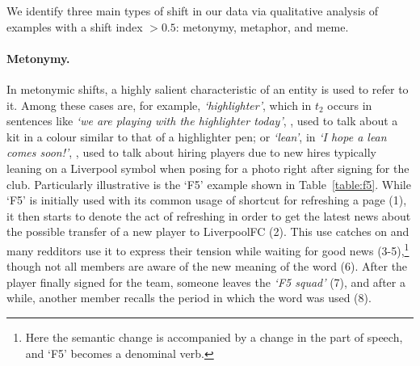 We identify three main types of shift in our data via qualitative analysis of examples with a shift index $> 0.5$: metonymy, metaphor, and meme.  

\paragraph{Metonymy.}
In metonymic shifts, a highly salient characteristic of an entity is used to refer to it. Among these cases are, for example, {\em `highlighter'}, which in $t_2$ occurs in sentences like \textit{`we are playing with the highlighter today'},
, 
used to talk about a kit in a colour similar to that of a highlighter pen; or {\em `lean'}, in \textit{`I hope a lean comes soon!'},
, 
used to talk about hiring players due to new hires typically leaning on a Liverpool symbol when posing for a photo right after signing for the club. Particularly illustrative is the `F5' example shown in
Table~\ref{table:f5}. While `F5' is initially used with its common usage of shortcut for refreshing a page (1), it then starts to denote the act of refreshing in order to get the latest news about the possible transfer of a new player to LiverpoolFC (2). This use catches on and many redditors use it to express their tension while waiting for good news (3-5),\footnote{Here the semantic change is accompanied by a change in the part of speech, and `F5' becomes a denominal verb.}
though not all members are aware of the new meaning of the word (6). After the player finally signed for the team, someone leaves the {\em `F5 squad'} (7), and after a while, another member recalls the period in which the word was used (8).


